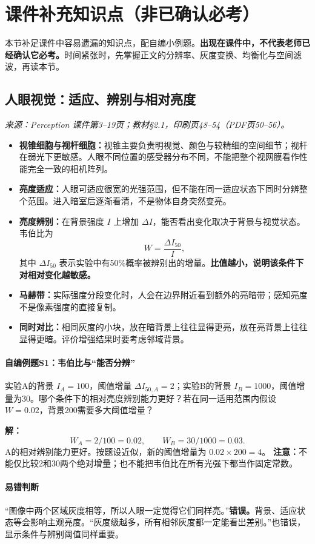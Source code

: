 \clearpage
\section{课件补充知识点（非已确认必考）}
本节补足课件中容易遗漏的知识点，配自编小例题。\textbf{出现在课件中，不代表老师已经确认它必考。}时间紧张时，先掌握正文的分辨率、灰度变换、均衡化与空间滤波，再读本节。

\subsection{人眼视觉：适应、辨别与相对亮度}
\textit{来源：Perception 课件第3--19页；教材\S2.1，印刷页48--54（PDF页50--56）。}
\begin{itemize}
\item \textbf{视锥细胞与视杆细胞：}视锥主要负责明视觉、颜色与较精细的空间细节；视杆在弱光下更敏感。人眼不同位置的感受器分布不同，不能把整个视网膜看作性能完全一致的相机阵列。
\item \textbf{亮度适应：}人眼可适应很宽的光强范围，但不能在同一适应状态下同时分辨整个范围。进入暗室后逐渐看清，不是物体自身突然变亮。
\item \textbf{亮度辨别：}在背景强度 $I$ 上增加 $\Delta I$，能否看出变化取决于背景与视觉状态。韦伯比为
\[
W=\frac{\Delta I_{50}}{I},
\]
其中 $\Delta I_{50}$ 表示实验中有50\%概率被辨别出的增量。\textbf{比值越小，说明该条件下对相对变化越敏感。}
\item \textbf{马赫带：}实际强度分段变化时，人会在边界附近看到额外的亮暗带；感知亮度不是像素强度的直接复制。
\item \textbf{同时对比：}相同灰度的小块，放在暗背景上往往显得更亮，放在亮背景上往往显得更暗。评价增强结果时要考虑邻域背景。
\end{itemize}

\paragraph{自编例题S1：韦伯比与“能否分辨”}
实验A的背景 $I_A=100$，阈值增量 $\Delta I_{50,A}=2$；实验B的背景 $I_B=1000$，阈值增量为30。哪个条件下的相对亮度辨别能力更好？若在同一适用范围内假设 $W=0.02$，背景200需要多大阈值增量？

\textbf{解：}
\[
W_A=2/100=0.02,\qquad W_B=30/1000=0.03.
\]
A的相对辨别能力更好。按题设近似，新的阈值增量为 $0.02\times200=4$。
\textbf{注意：}不能仅比较2和30两个绝对增量；也不能把韦伯比在所有光强下都当作固定常数。

\paragraph{易错判断}
“图像中两个区域灰度相等，所以人眼一定觉得它们同样亮。”\textbf{错误。}背景、适应状态等会影响主观亮度。“灰度级越多，所有相邻灰度都一定能看出差别。”也错误，显示条件与辨别阈值同样重要。

